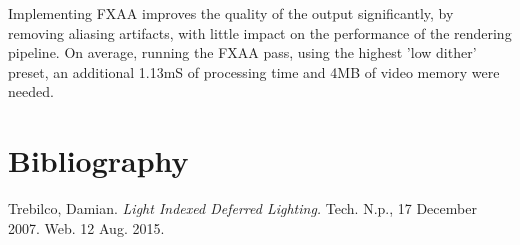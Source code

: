 \documentclass[11pt, oneside]{report}
\begin{document}
Implementing \gls{FXAA} improves the quality of the output significantly, by removing \gls{aliasing} artifacts, with little impact on the performance of the rendering pipeline. On average, running the \gls{FXAA} pass, using the highest 'low dither' preset, an additional 1.13mS of processing time and 4MB of video memory were needed.

\chapter{Bibliography}

\begingroup
	\def\chapter*#1{}
	\printbibliography[
		heading=bibintoc,
		title={Bibliography}
	]
\endgroup

Trebilco, Damian. \textit{Light Indexed Deferred Lighting.} Tech. N.p., 17 December 2007. Web. 12 Aug. 2015.

\printglossaries
\end{document}
